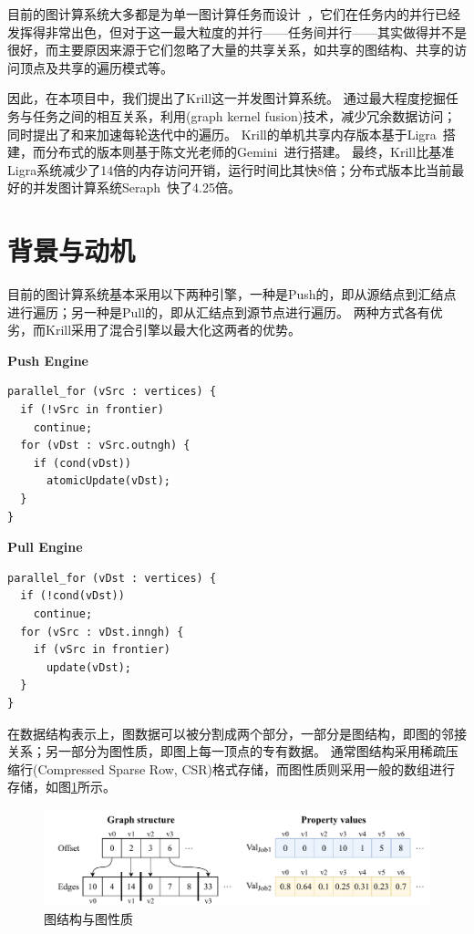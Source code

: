 \documentclass[logo,reportComp]{thesis}
\let\emph\relax %
\begin{document}
目前的图计算系统大多都是为单一图计算任务而设计~\cite{shun:ligra_ppopp_2013,sundaram:graphmat_vldb_2015,pingali:galois_ppaa_2014,malewicz:pregel_icmd_2010,ching:giraph_vldb_2015,low:graphlab_vldb_2012}，它们在任务内的并行已经发挥得非常出色，但对于这一最大粒度的并行——任务间并行——其实做得并不是很好，而主要原因来源于它们忽略了大量的共享关系，如共享的图结构、共享的访问顶点及共享的遍历模式等。

因此，在本项目中，我们提出了Krill这一并发图计算系统。
通过最大程度挖掘任务与任务之间的相互关系，利用\emph{图核融合}(graph kernel fusion)技术，减少冗余数据访问；同时提出了\emph{快速边界筛}和\emph{提前任务筛}来加速每轮迭代中的遍历。
Krill的单机共享内存版本基于Ligra~\cite{shun:ligra_ppopp_2013}搭建，而分布式的版本则基于陈文光老师的Gemini~\cite{zhu:gemini_osdi_2016}进行搭建。
最终，Krill比基准Ligra系统减少了14倍的内存访问开销，运行时间比其快8倍；分布式版本比当前最好的并发图计算系统Seraph~\cite{xue:seraph_hpdc_2014}快了4.25倍。

\section{背景与动机}
目前的图计算系统基本采用以下两种引擎，一种是Push的，即从源结点到汇结点进行遍历；另一种是Pull的，即从汇结点到源节点进行遍历。
两种方式各有优劣，而Krill采用了混合引擎以最大化这两者的优势。
\begin{center}
\begin{minipage}{0.45\linewidth}
\centering \textbf{Push Engine}
\begin{lstlisting}
parallel_for (vSrc : vertices) {
  if (!vSrc in frontier)
    continue;
  for (vDst : vSrc.outngh) {
    if (cond(vDst))
      atomicUpdate(vDst);
  }
}
\end{lstlisting}
\end{minipage}\hfill
\begin{minipage}{0.45\linewidth}
\centering \textbf{Pull Engine}
\begin{lstlisting}
parallel_for (vDst : vertices) {
  if (!cond(vDst))
    continue;
  for (vSrc : vDst.inngh) {
    if (vSrc in frontier)
      update(vDst);
  }
}
\end{lstlisting}
\end{minipage}
\end{center}

在数据结构表示上，图数据可以被分割成两个部分，一部分是图结构，即图的邻接关系；另一部分为图性质，即图上每一顶点的专有数据。
通常图结构采用稀疏压缩行(Compressed Sparse Row, CSR)格式存储，而图性质则采用一般的数组进行存储，如图\ref{fig:data_structure}所示。
\begin{figure}[H]
\centering
\includegraphics[width=0.8\linewidth]{fig/krill-Data-structure.pdf}
\caption{图结构与图性质}
\label{fig:data_structure}
\end{figure}
\end{document}
